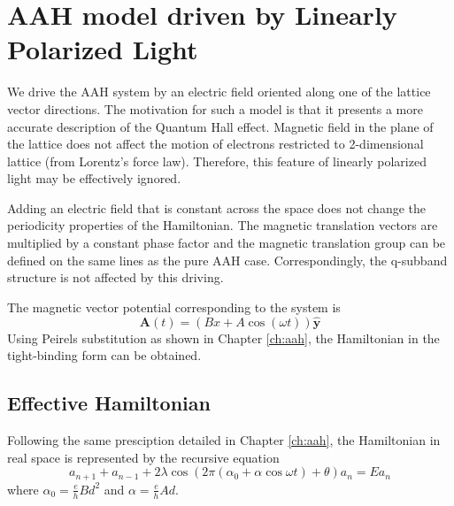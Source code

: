 %

\chapter{AAH model driven by Linearly Polarized Light}
We drive the AAH system by an electric field oriented along one of the lattice vector directions. The motivation for such a model is that it presents a more accurate description
of the Quantum Hall effect. Magnetic field in the plane of the lattice does not affect the motion of electrons restricted to 2-dimensional lattice (from Lorentz's force law). Therefore,
this feature of linearly polarized light may be effectively ignored.

Adding an electric field that is constant across the space does not change the periodicity properties of the Hamiltonian. The magnetic translation vectors are multiplied by a
constant phase factor and the magnetic translation group can be defined on the same lines as the pure AAH case. Correspondingly, the q-subband structure is not affected by this driving.

The magnetic vector potential corresponding to the system is
\begin{equation}
 \mathbf{A}(t) = (Bx + A\cos(\omega t)) \hat{\mathbf{y}}
\end{equation}
Using Peirels substitution as shown in Chapter \ref{ch:aah}, the Hamiltonian in the tight-binding form can be obtained.
\section{Effective Hamiltonian}
Following the same presciption detailed in Chapter \ref{ch:aah}, the Hamiltonian in real space is represented by the recursive equation
\begin{equation}
 a_{n+1} + a_{n-1} + 2\lambda\cos(2\pi(\alpha_0 + \alpha \cos{\omega t}) + \theta) a_{n} = E a_{n}
\end{equation} where $\alpha_0 = \frac{e}{h}Bd^2$ and $\alpha = \frac{e}{h}Ad$.


